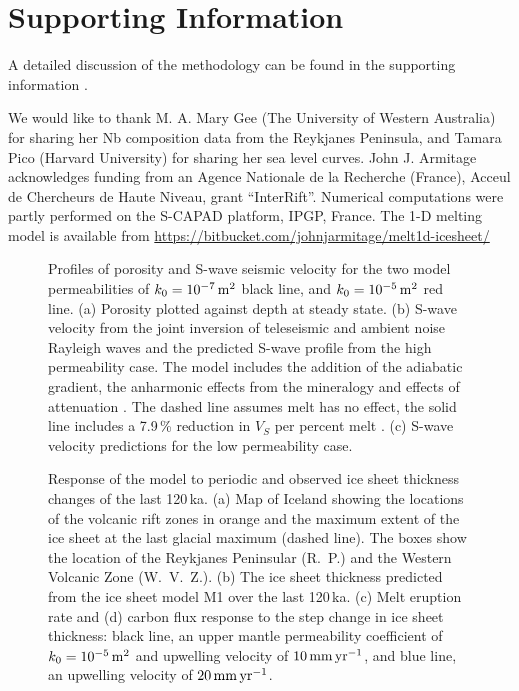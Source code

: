 \documentclass[draft,linenumbers]{agujournal2018}
\begin{document}
\section*{Supporting Information}

A detailed discussion of the methodology can be found in the supporting information \citep{andersen-etal-2004,andrews-2008,armitage-etal-g3-2011,clark-etal-2009,geirsdottir-2011,gibson-2010,gurenko-1995,katz-etal-2003,lambeck-2001,lambeck-etal-2014,mckenzie-1991,miller-etal-2014,ribe-1985,scott-1992,shorttle-2011,silbeck-1975,sleep-1976,spiegelman-1996,spratt-2016}.

\acknowledgments
We would like to thank M. A. Mary Gee (The University of Western Australia) for sharing her Nb composition data from the Reykjanes Peninsula, and Tamara Pico (Harvard University) for sharing her sea level curves. John J. Armitage acknowledges funding from an Agence Nationale de la Recherche (France), Acceul de Chercheurs de Haute Niveau, grant “InterRift”. Numerical computations were partly performed on the S-CAPAD platform, IPGP, France. The 1-D melting model is available from \url{https://bitbucket.com/johnjarmitage/melt1d-icesheet/}



\clearpage
\pagebreak
\newpage

\begin{figure}
\caption{Profiles of porosity and S-wave seismic velocity for the two model permeabilities of $k_{0} = 10^{-7}\rm\,m^{2}$ black line, and $k_{0} = 10^{-5}\rm\,m^{2}$ red line. (a) Porosity plotted against depth at steady state. (b) S-wave velocity from the joint inversion of teleseismic and ambient noise Rayleigh waves \citep{harmon-2016} and the predicted S-wave profile from the high permeability case. The model includes the addition of the adiabatic gradient, the anharmonic effects from the mineralogy and effects of attenuation \citep{goes-etal-2012}. The dashed line assumes melt has no effect, the solid line includes a 7.9\,\% reduction in $V_{S}$ per percent melt \citep{hammond-2000}. (c) S-wave velocity predictions for the low permeability case.}
\label{fg:2}
\end{figure}

\begin{figure}
\caption{Response of the model to periodic and observed ice sheet thickness changes of the last 120\,ka. (a) Map of Iceland showing the locations of the volcanic rift zones in orange and the maximum extent of the ice sheet at the last glacial maximum (dashed line). The boxes show the location of the Reykjanes Peninsular (R.~P.) and the Western Volcanic Zone (W.~V.~Z.). (b) The ice sheet thickness predicted from the ice sheet model M1 over the last 120\,ka. (c) Melt eruption rate and (d) carbon flux response to the step change in ice sheet thickness: black line, an upper mantle permeability coefficient of $k_{0} = 10^{-5}\rm\,m^{2}$ and upwelling velocity of $10\rm\,mm\,yr^{-1}$, and blue line, an upwelling velocity of $20\rm\,mm\,yr^{-1}$.}
\label{fg:4}
\end{figure}
\end{document}
